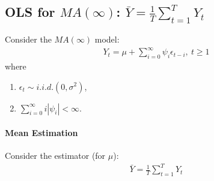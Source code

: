 \documentclass[11pt]{elegantbook}
\begin{document}
\subsection{OLS for $MA(\infty)$: $\bar{Y}=\frac{1}{T}\sum_{t=1}^T Y_t$}
Consider the $MA(\infty)$ model:
\begin{equation}
    \begin{aligned}
        Y_t=\mu+\sum_{i=0}^\infty \psi_i\epsilon_{t-i},\ t\geq 1
    \end{aligned}
    \nonumber
\end{equation}
where
\begin{enumerate}
    \item $\epsilon_t\sim i.i.d.(0,\sigma^2)$,
    \item $\sum_{i=0}^\infty i|\psi_i|<\infty$.
\end{enumerate}

\paragraph*{Mean Estimation}
Consider the estimator (for $\mu$):
\begin{equation}
    \begin{aligned}
        \bar{Y}=\frac{1}{T}\sum_{t=1}^T Y_t
    \end{aligned}
    \nonumber
\end{equation}
\end{document}
